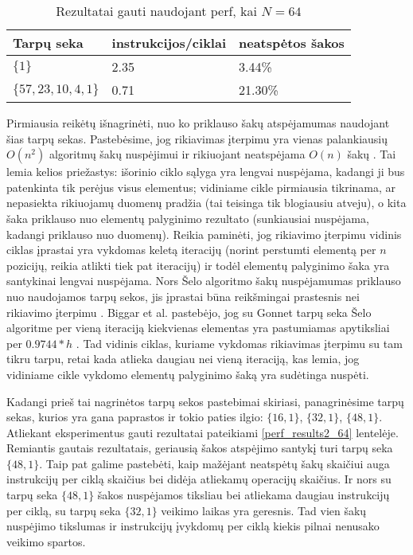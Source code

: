 \documentclass{VUMIFInfBakalaurinis}
\begin{document}
\begin{table}[H]
  \caption{Rezultatai gauti naudojant perf, kai $N = 64$}
  \label{perf_results_64}
  \centering
  \begin{tabular}{@{}lll@{}}
  Tarpų seka            & instrukcijos/ciklai     & neatspėtos šakos \\ \midrule
  $\{1\}$               & 2.35                    & 3.44\%           \\
  $\{57,23,10,4,1\}$    & 0.71                    & 21.30\%          \\ \bottomrule
  \end{tabular}
\end{table}


Pirmiausia reikėtų išnagrinėti, nuo ko priklauso šakų atspėjamumas naudojant šias tarpų sekas.
Pastebėsime, jog rikiavimas įterpimu yra vienas palankiausių $O(n^2)$ algoritmų šakų nuspėjimui
ir rikiuojant neatspėjama $O(n)$ šakų \cite{biggar2005sorting}.
Tai lemia kelios priežastys: išorinio ciklo sąlyga yra lengvai nuspėjama, kadangi ji bus patenkinta tik perėjus visus elementus;
vidiniame cikle pirmiausia tikrinama, ar nepasiekta rikiuojamų duomenų pradžia (tai teisinga tik blogiausiu atveju),
o kita šaka priklauso nuo elementų palyginimo rezultato (sunkiausiai nuspėjama, kadangi priklauso nuo duomenų).
Reikia paminėti, jog rikiavimo įterpimu vidinis ciklas įprastai yra vykdomas keletą iteracijų (norint perstumti elementą per $n$ pozicijų, reikia atlikti tiek pat iteracijų)
ir todėl elementų palyginimo šaka yra santykinai lengvai nuspėjama.
Nors Šelo algoritmo šakų nuspėjamumas priklauso nuo naudojamos tarpų sekos, jis įprastai būna reikšmingai prastesnis nei rikiavimo įterpimu \cite{biggar2005sorting}.
Biggar et al. pastebėjo, jog su Gonnet tarpų seka Šelo algoritme per vieną iteraciją kiekvienas elementas yra pastumiamas apytiksliai per $0.9744 * h$ \cite{biggar2008experimental}.
Tad vidinis ciklas, kuriame vykdomas rikiavimas įterpimu su tam tikru tarpu, retai kada atlieka daugiau nei vieną iteraciją, kas lemia, jog
vidiniame cikle vykdomo elementų palyginimo šaką yra sudėtinga nuspėti.

Kadangi prieš tai nagrinėtos tarpų sekos pastebimai skiriasi, panagrinėsime tarpų sekas, kurios yra gana paprastos ir tokio paties ilgio: $\{16, 1\}$, $\{32, 1\}$, $\{48, 1\}$.
Atliekant eksperimentus gauti rezultatai pateikiami \ref{perf_results2_64} lentelėje.
Remiantis gautais rezultatais, geriausią šakos atspėjimo santykį turi tarpų seka $\{48, 1\}$.
Taip pat galime pastebėti, kaip mažėjant neatspėtų šakų skaičiui auga instrukcijų per ciklą skaičius bei didėja atliekamų operacijų skaičius.
Ir nors su tarpų seka $\{48, 1\}$ šakos nuspėjamos tiksliau bei atliekama daugiau instrukcijų per ciklą, su tarpų seka $\{32, 1\}$ veikimo laikas yra geresnis.
Tad vien šakų nuspėjimo tikslumas ir instrukcijų įvykdomų per ciklą kiekis pilnai nenusako veikimo spartos. 
\end{document}
